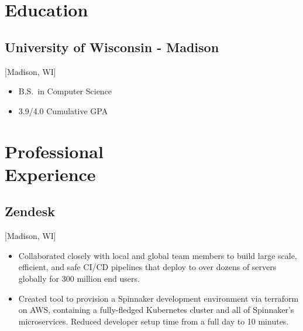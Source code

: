 \documentclass{mycv}
\begin{document}
\maketitle
\section{Education}
\subsection{University of Wisconsin - Madison}[Madison, WI]
\begin{itemize}[label={}]
  \item B.S.\ in Computer Science 
  \item 3.9/4.0 Cumulative GPA
\end{itemize}
\section{Professional \\ Experience}
\subsection{Zendesk}[Madison, WI]
\begin{positions}
\end{positions}
\begin{itemize}
  \item {
     Collaborated closely with local and global team members to build large scale, efficient, and safe CI/CD pipelines that deploy to over dozens of servers globally for 300 million end users.
  }
  \item {
  Created tool to provision a Spinnaker development environment via terraform on AWS, containing a fully-fledged Kubernetes cluster and all of Spinnaker's microservices. Reduced developer setup time from a full day to 10 minutes. 
  }
 \end{itemize}
  
  
\end{document}
